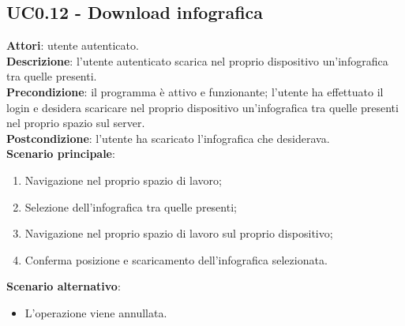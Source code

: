 \subsection{UC0.12 - Download infografica}{
	\label{uc0.12}
	\textbf{Attori}: utente autenticato.\\
	\textbf{Descrizione}: l'utente autenticato scarica nel proprio dispositivo un'infografica tra quelle presenti.\\
	\textbf{Precondizione}: il programma è attivo e funzionante; l'utente ha effettuato il login e desidera scaricare nel proprio dispositivo un'infografica tra quelle presenti nel proprio spazio sul server.	\\
	\textbf{Postcondizione}: l'utente ha scaricato l'infografica che desiderava.\\
	\textbf{Scenario principale}:
	\begin{enumerate}
		\item Navigazione nel proprio spazio di lavoro;
		\item Selezione dell'infografica tra quelle presenti;
		\item Navigazione nel proprio spazio di lavoro sul proprio dispositivo;
		\item Conferma posizione e scaricamento dell'infografica selezionata.
		\end{enumerate}	
	\textbf{Scenario alternativo}:
	\begin{itemize}
		\item L'operazione viene annullata.
	\end{itemize}
	}